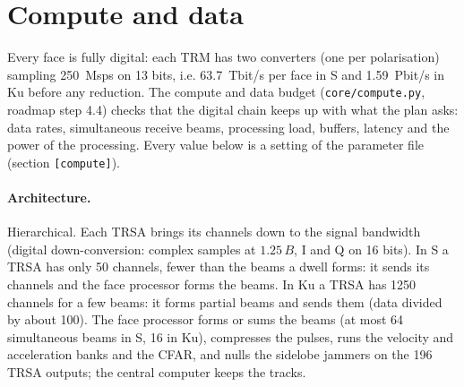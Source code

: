 \documentclass[11pt,a4paper]{article}
\newcommand{\code}[1]{\texttt{\small #1}}
\begin{document}
\section{Compute and data}\label{sec:compute}
Every face is fully digital: each TRM has two converters (one per polarisation) sampling \SI{250}{Msps} on 13 bits,
i.e. \SI{63.7}{Tbit/s} per face in S and \SI{1.59}{Pbit/s} in Ku before any reduction. The compute and data budget
(\code{core/compute.py}, roadmap step 4.4) checks that the digital chain keeps up with what the plan asks: data rates,
simultaneous receive beams, processing load, buffers, latency and the power of the processing. Every value below is a
setting of the parameter file (section \code{[compute]}).

\paragraph{Architecture.} Hierarchical. Each TRSA brings its channels down to the signal bandwidth (digital
down-conversion: complex samples at $1.25\,B$, I and Q on 16 bits). In S a TRSA has only 50 channels, fewer than the
beams a dwell forms: it sends its channels and the face processor forms the beams. In Ku a TRSA has \num{1250} channels
for a few beams: it forms partial beams and sends them (data divided by about 100). The face processor forms or sums
the beams (at most 64 simultaneous beams in S, 16 in Ku), compresses the pulses, runs the velocity and acceleration
banks and the CFAR, and nulls the sidelobe jammers on the 196 TRSA outputs; the central computer keeps the tracks.
\end{document}
